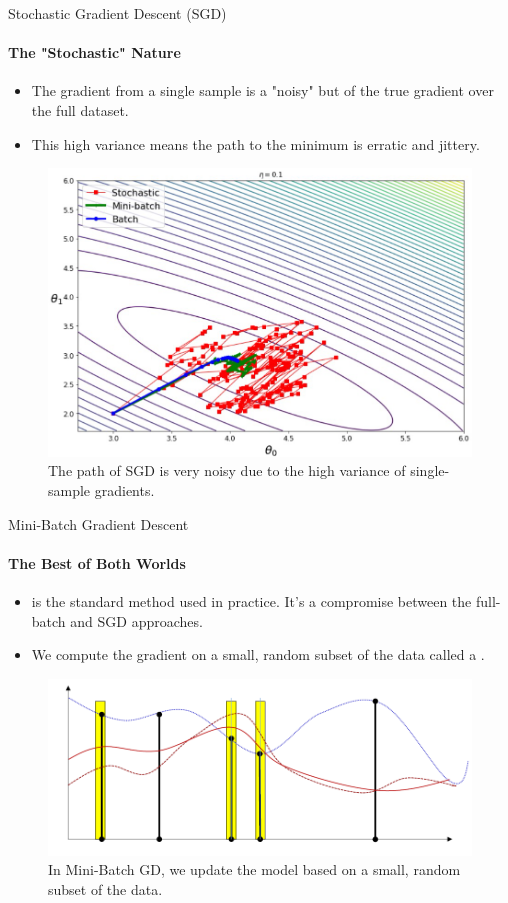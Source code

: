 \begin{frame}{Stochastic Gradient Descent (SGD)}
    \framesubtitle{The "Stochastic" Nature}
    \begin{itemize}
        \item The gradient from a single sample is a "noisy" but  of the true gradient over the full dataset.
        \item This high variance means the path to the minimum is erratic and jittery.
    \end{itemize}
    \begin{figure}
        \centering
        \includegraphics[width=0.6\linewidth]{images/sgd_pathj.png}
        \caption{The path of SGD is very noisy due to the high variance of single-sample gradients.}
    \end{figure}
\end{frame}

\begin{frame}{Mini-Batch Gradient Descent}
    \framesubtitle{The Best of Both Worlds}
    \begin{itemize}
        \item {} is the standard method used in practice. It's a compromise between the full-batch and SGD approaches.
        \item We compute the gradient on a small, random subset of the data called a .
    \end{itemize}
    \begin{figure}
        \centering
        \includegraphics[width=0.7\linewidth]{images/minibatch_idea.png}
        \caption{In Mini-Batch GD, we update the model based on a small, random subset of the data.}
    \end{figure}
\end{frame}

